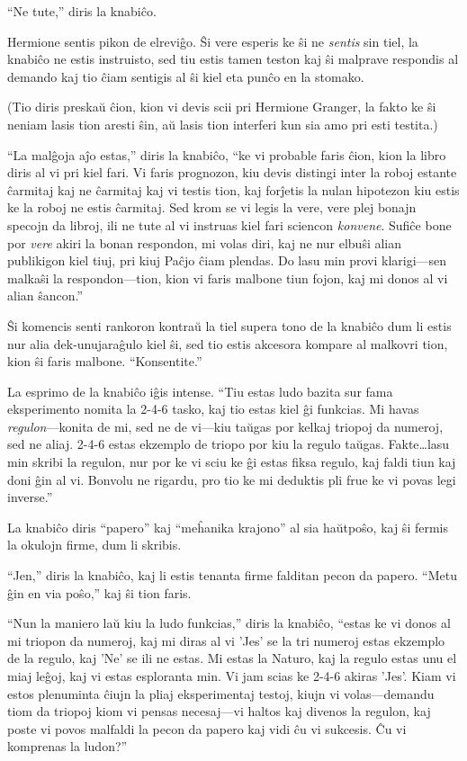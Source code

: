 ``Ne tute,'' diris la knabiĉo.

Hermione sentis pikon de elreviĝo. Ŝi vere esperis ke ŝi ne
\emph{sentis} sin tiel, la knabiĉo ne estis instruisto, sed tiu estis
tamen teston kaj ŝi malprave respondis al demando kaj tio ĉiam
sentigis al ŝi kiel eta punĉo en la stomako.

(Tio diris preskaŭ ĉion, kion vi devis scii pri Hermione Granger, la
fakto ke ŝi neniam lasis tion aresti ŝin, aŭ lasis tion interferi kun
sia amo pri esti testita.)

``La malĝoja aĵo estas,'' diris la knabiĉo, ``ke vi probable faris
ĉion, kion la libro diris al vi pri kiel fari. Vi faris prognozon, kiu
devis distingi inter la roboj estante ĉarmitaj kaj ne ĉarmitaj kaj vi
testis tion, kaj forĵetis la nulan hipotezon kiu estis ke la roboj ne
estis ĉarmitaj. Sed krom se vi legis la vere, vere plej bonajn specojn
da libroj, ili ne tute al vi instruas kiel fari sciencon
\emph{konvene}. Sufiĉe bone por \emph{vere} akiri la bonan respondon,
mi volas diri, kaj ne nur elbuŝi alian publikigon kiel tiuj, pri kiuj
Paĉjo ĉiam plendas. Do lasu min provi klarigi—sen malkaŝi la
respondon—tion, kion vi faris malbone tiun fojon, kaj mi donos al vi
alian ŝancon.''

Ŝi komencis senti rankoron kontraŭ la tiel supera tono de la knabiĉo
dum li estis nur alia dek-unujaraĝulo kiel ŝi, sed tio estis akcesora
kompare al malkovri tion, kion ŝi faris malbone. ``Konsentite.''

La esprimo de la knabiĉo iĝis intense. ``Tiu estas ludo bazita sur
fama eksperimento nomita la 2-4-6 tasko, kaj tio estas kiel ĝi
funkcias. Mi havas \emph{regulon}—konita de mi, sed ne de vi—kiu
taŭgas por kelkaj triopoj da numeroj, sed ne aliaj. 2-4-6 estas
ekzemplo de triopo por kiu la regulo taŭgas. Fakte\ldots lasu min
skribi la regulon, nur por ke vi sciu ke ĝi estas fiksa regulo, kaj
faldi tiun kaj doni ĝin al vi. Bonvolu ne rigardu, pro tio ke mi
deduktis pli frue ke vi povas legi inverse.''

La knabiĉo diris ``papero'' kaj ``meĥanika krajono'' al sia haŭtpoŝo,
kaj ŝi fermis la okulojn firme, dum li skribis.

``Jen,'' diris la knabiĉo, kaj li estis tenanta firme falditan pecon
da papero. ``Metu ĝin en via poŝo,'' kaj ŝi tion faris.

``Nun la maniero laŭ kiu la ludo funkcias,'' diris la knabiĉo, ``estas
ke vi donos al mi triopon da numeroj, kaj mi diras al vi 'Jes' se la
tri numeroj estas ekzemplo de la regulo, kaj 'Ne' se ili ne estas. Mi
estas la Naturo, kaj la regulo estas unu el miaj leĝoj, kaj vi estas
esploranta min. Vi jam scias ke 2-4-6 akiras 'Jes'. Kiam vi estos
plenuminta ĉiujn la pliaj eksperimentaj testoj, kiujn vi volas—demandu
tiom da triopoj kiom vi pensas necesaj—vi haltos kaj divenos la
regulon, kaj poste vi povos malfaldi la pecon da papero kaj vidi ĉu vi
sukcesis. Ĉu vi komprenas la ludon?''

